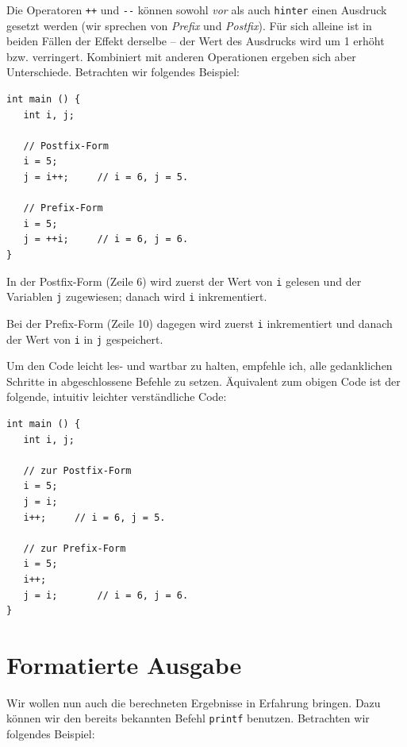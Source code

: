 \begin{hintbox}
Die Operatoren \texttt{++} und \texttt{-{}-} können sowohl \emph{vor} als auch \texttt{hinter} einen Ausdruck gesetzt werden (wir sprechen von \emph{Prefix} und \emph{Postfix}). Für sich alleine ist in beiden Fällen der Effekt derselbe -- der Wert des Ausdrucks wird um 1 erhöht bzw. verringert. Kombiniert mit anderen Operationen ergeben sich aber Unterschiede. Betrachten wir folgendes Beispiel:

\begin{codebox}
\begin{verbatim}
int main () {
   int i, j;

   // Postfix-Form
   i = 5;
   j = i++;		// i = 6, j = 5.

   // Prefix-Form
   i = 5;
   j = ++i;		// i = 6, j = 6.
}
\end{verbatim}
\end{codebox}

In der Postfix-Form (Zeile 6) wird zuerst der Wert von \texttt{i} gelesen und der Variablen \texttt{j} zugewiesen; danach wird \texttt{i} inkrementiert.

Bei der Prefix-Form (Zeile 10) dagegen wird zuerst \texttt{i} inkrementiert und danach der Wert von \texttt{i} in \texttt{j} gespeichert.
\end{hintbox}
%
\begin{hintbox}[]
Um den Code leicht les- und wartbar zu halten, empfehle ich, alle gedanklichen Schritte in abgeschlossene Befehle zu setzen. Äquivalent zum obigen Code ist der folgende, intuitiv leichter verständliche Code:

\begin{codebox}
\begin{verbatim}
int main () {
   int i, j;

   // zur Postfix-Form
   i = 5;
   j = i;
   i++;		// i = 6, j = 5.

   // zur Prefix-Form
   i = 5;
   i++;
   j = i;		// i = 6, j = 6.
}
\end{verbatim}
\end{codebox}
\end{hintbox}

\section{Formatierte Ausgabe}\label{sec:formattedOutput}
Wir wollen nun auch die berechneten Ergebnisse in Erfahrung bringen. Dazu können wir den bereits bekannten Befehl \texttt{printf} benutzen. Betrachten wir folgendes Beispiel:

